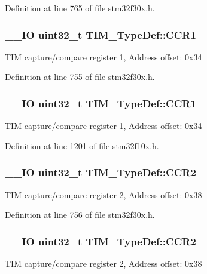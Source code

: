 Definition at line 765 of file stm32f30x.\-h.

\hypertarget{struct_t_i_m___type_def_a0dd9c06729a5eb6179c6d0d60faca7ed}{
\subsubsection[{C\-C\-R1}]{\setlength{\rightskip}{0pt plus 5cm}\-\_\-\-\_\-\-I\-O {\bf uint32\-\_\-t} T\-I\-M\-\_\-\-Type\-Def\-::\-C\-C\-R1}}\label{struct_t_i_m___type_def_a0dd9c06729a5eb6179c6d0d60faca7ed}
T\-I\-M capture/compare register 1, Address offset\-: 0x34 

Definition at line 755 of file stm32f30x.\-h.

\hypertarget{struct_t_i_m___type_def_a0dd9c06729a5eb6179c6d0d60faca7ed}{
\subsubsection[{C\-C\-R1}]{\setlength{\rightskip}{0pt plus 5cm}\-\_\-\-\_\-\-I\-O {\bf uint32\-\_\-t} T\-I\-M\-\_\-\-Type\-Def\-::\-C\-C\-R1}}\label{struct_t_i_m___type_def_a0dd9c06729a5eb6179c6d0d60faca7ed}
T\-I\-M capture/compare register 1, Address offset\-: 0x34 

Definition at line 1201 of file stm32f10x.\-h.

\hypertarget{struct_t_i_m___type_def_a4d1171e9a61538424b8ef1f2571986d0}{
\subsubsection[{C\-C\-R2}]{\setlength{\rightskip}{0pt plus 5cm}\-\_\-\-\_\-\-I\-O {\bf uint32\-\_\-t} T\-I\-M\-\_\-\-Type\-Def\-::\-C\-C\-R2}}\label{struct_t_i_m___type_def_a4d1171e9a61538424b8ef1f2571986d0}
T\-I\-M capture/compare register 2, Address offset\-: 0x38 

Definition at line 756 of file stm32f30x.\-h.

\hypertarget{struct_t_i_m___type_def_a4d1171e9a61538424b8ef1f2571986d0}{
\subsubsection[{C\-C\-R2}]{\setlength{\rightskip}{0pt plus 5cm}\-\_\-\-\_\-\-I\-O {\bf uint32\-\_\-t} T\-I\-M\-\_\-\-Type\-Def\-::\-C\-C\-R2}}\label{struct_t_i_m___type_def_a4d1171e9a61538424b8ef1f2571986d0}
T\-I\-M capture/compare register 2, Address offset\-: 0x38 

